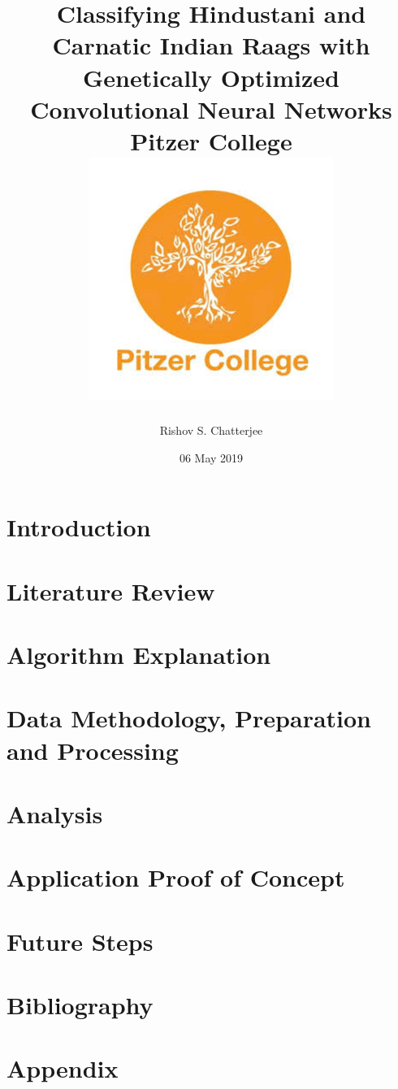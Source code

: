 \documentclass[12pt]{report}
\title{
{Classifying Hindustani and Carnatic Indian Raags with Genetically Optimized Convolutional Neural Networks}\\
{\large Pitzer College}\\
{\includegraphics{university_1.png}}
}
\author{Rishov S. Chatterjee}
\date{06 May 2019}
\begin{document}
\maketitle{}
\chapter{Introduction}


\chapter{Literature Review}


\chapter{Algorithm Explanation}


\chapter{Data Methodology, Preparation and Processing}


\chapter{Analysis}


\chapter{Application Proof of Concept}


\chapter{Future Steps}


\chapter{Bibliography}


\chapter{Appendix}

\end{document}
